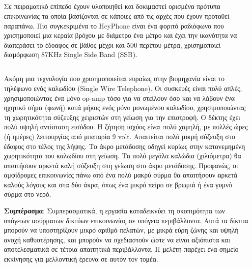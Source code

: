\documentclass[12pt]{article}
\begin{document}
\begin{multicols}{2}
    \subsection{}
    Σε πειραματικό επίπεδο έχουν υλοποιηθεί και δοκιμαστεί ορισμένα πρότυπα επικοινωνίας τα οποία βασίζονται σε κάποιες από τις αρχές που έχουν προταθεί παραπάνω. Πιο συγκεκριμένα το HeyPhone είναι ένα φοριτό ραδιόφωνο που χρισημοποιεί μια κεραία βρόχου με διάμετρο ένα μέτρο και έχει την ικανότητα να διαπεράσει το έδοαφος σε βάθος μέχρι και 500 περίπου μέτρα, χρισημοποιεί διαμόρφωση 87KHz Single Side Band (SSB).
    \subsection{}
    Ακόμη μια τεχνολογία που χρισημοποιείται ευραίως στην βιομηχανία είναι το τηλέφωνο ενός καλωδίου (Single Wire Telephone). Οι συσκευές είναι πολύ απλές, χρησιμοποιώντας ένα μόνο op-amp τόσο για να στείλουν όσο και να λάβουν ένα ηχητικό σήμα (φωνή) κατά μήκος ενός μόνο μονωμένου καλωδίου, χρησιμοποιώντας τη χωρητικότητα σύζευξης χειριστών στη γείωση για την επιστροφή. Ο δέκτης έχει πολύ υψηλή αντίσταση εισόδου. Η ζήτηση ισχύος είναι πολύ χαμηλή, με πολλές ώρες (ή ημέρες) λειτουργίας από μπαταρία 9 volt. Απαιτείται πολύ μικρή σύζευξη στο έδαφος στο τέλος της λήψης. Το άκρο μετάδοσης οδηγεί κυρίως στην κατανεμημένη χωρητικότητα του καλωδίου στη γείωση. Τα πολύ μεγάλα καλώδια (χιλιόμετρα) θα απαιτήσουν αρκετά καλή σύζευξη στη γείωση στο άκρο μετάδοσης. Προφανώς, οι αμφίδρομες επικοινωνίες πάνω από ένα πολύ μακρύ σύρμα θα απαιτήσουν αρκετά καλούς λόγους και στα δύο άκρα, όπως ένα μικρό πείρο σε βρωμιά ή ένα γυμνό σύρμα στο νερό.

    \textbf{Συμπέρασμα}: Συμπερασματικά, η εργασία καταδεικνύει τη σκοπιμότητα των υπόγειων ασύρματων δικτύων επικοινωνίας σε υπόγεια περιβάλλοντα. Αυτά τα δίκτυα μπορούν να υποστηρίξουν μικρό αριθμό πελατών, με μικρά εύρη ζώνης και υψηλή ανοχή καθυστέρησης, και μπορούν να σχεδιαστούν ώστε να είναι αξιόπιστα και αποτελεσματικά σε τέτοια απαιτητικά περιβάλλοντα. Η μελέτη παρέχει ένα σημείο εκκίνησης για μελλοντική έρευνα σε αυτόν τον τομέα.
\end{multicols}
\end{document}
